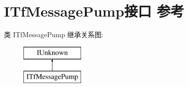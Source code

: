 \hypertarget{interface_i_tf_message_pump}{}\section{I\+Tf\+Message\+Pump接口 参考}
\label{interface_i_tf_message_pump}
类 I\+Tf\+Message\+Pump 继承关系图\+:\begin{figure}[H]
\begin{center}
\leavevmode
\includegraphics[height=2.000000cm]{interface_i_tf_message_pump}
\end{center}
\end{figure}
